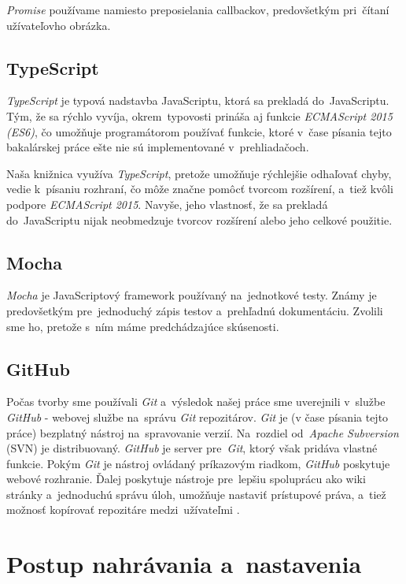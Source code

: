 \emph{Promise} používame namiesto preposielania callbackov, predovšetkým pri~čítaní užívateľovho obrázka.

\subsection{TypeScript}

\emph{TypeScript} je typová nadstavba JavaScriptu, ktorá sa prekladá do~JavaScriptu. Tým, že sa rýchlo vyvíja, okrem~typovosti prináša aj funkcie \emph{ECMAScript 2015 (ES6)}, čo umožňuje programátorom používať funkcie, ktoré v~čase písania tejto bakalárskej práce ešte nie sú implementované v~prehliadačoch.

Naša knižnica využíva \emph{TypeScript}, pretože umožňuje rýchlejšie odhaľovať chyby, vedie k~písaniu rozhraní, čo môže značne pomôcť tvorcom rozšírení, a~tiež kvôli podpore \emph{ECMAScript 2015}. Navyše, jeho vlastnosť, že sa prekladá do~JavaScriptu nijak neobmedzuje tvorcov rozšírení alebo jeho celkové použitie.

\subsection{Mocha}

\emph{Mocha} je JavaScriptový framework používaný na~jednotkové testy. Známy je predovšetkým pre~jednoduchý zápis testov a~prehľadnú dokumentáciu. Zvolili sme ho, pretože s~ním máme predchádzajúce skúsenosti.


\subsection{GitHub}

Počas tvorby sme používali \emph{Git} a~výsledok našej práce sme uverejnili v~službe \emph{GitHub} - webovej službe na~správu \emph{Git} repozitárov. \emph{Git} je (v čase písania tejto práce) bezplatný nástroj na~spravovanie verzií. Na~rozdiel od~\emph{Apache Subversion} (SVN) je distribuovaný. \emph{GitHub} je server pre~\emph{Git}, ktorý však pridáva vlastné funkcie. Pokým \emph{Git} je nástroj ovládaný príkazovým riadkom, \emph{GitHub} poskytuje webové rozhranie. Ďalej poskytuje nástroje pre~lepšiu spoluprácu ako wiki stránky a~jednoduchú správu úloh, umožňuje nastaviť prístupové práva, a~tiež možnosť kopírovať repozitáre medzi~užívateľmi \cite{Git_TechCrunch}. 


\section{Postup nahrávania a~nastavenia}
\label{sec:upload-and-settings}

